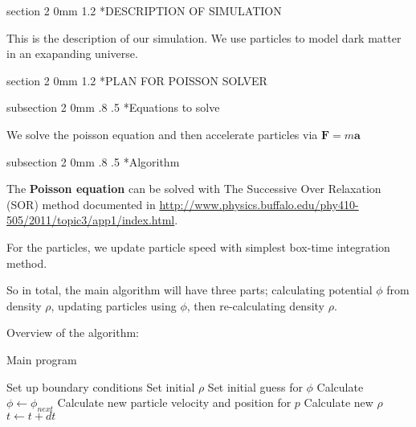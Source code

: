 \documentclass[titlepage, 11pt]{article}
\makeatletter
\renewcommand{\section}{\@startsection
        {section}
        {2}
        {0mm}
        {1.2\baselineskip}
        {\baselineskip}
        {\centering\normalsize}}
\renewcommand{\subsection}{\@startsection
        {subsection}
        {2}
        {0mm}
        {.8\baselineskip}
        {.5\baselineskip}
        {\bfseries\normalsize}}
\makeatother
\begin{document}


%

\section*{DESCRIPTION OF SIMULATION}

This is the description of our simulation. We use particles to model dark
matter in an exapanding universe.

\section*{PLAN FOR POISSON SOLVER}

\subsection*{Equations to solve}

We solve the poisson equation and then accelerate particles via $\mathbf{F}=m\mathbf{a}$

\subsection*{Algorithm}

The \textbf{Poisson equation} can be solved with The Successive Over Relaxation (SOR) 
method documented in \url{http://www.physics.buffalo.edu/phy410-505/2011/topic3/app1/index.html}. 

For the particles, we update particle speed with simplest box-time integration method.

So in total, the main algorithm will have three parts; calculating potential $\phi$ 
from density $\rho$, updating particles using $\phi$, then re-calculating density 
$\rho$.

Overview of the algorithm:

\begin{algorithm}
 \label{alg:main}
 \caption{Main program}
 \begin{algorithmic}
  \State Set up boundary conditions
  \State Set initial $\rho$
  \State Set initial guess for $\phi$
  \Loop
   \State Calculate $\phi \gets \phi_{next}$
    \State Calculate new particle velocity and position for $p$
   \EndFor
   \State Calculate new $\rho$
   \State $t \gets t+dt$
  \EndLoop
 \end{algorithmic}

\end{algorithm}
\end{document}
